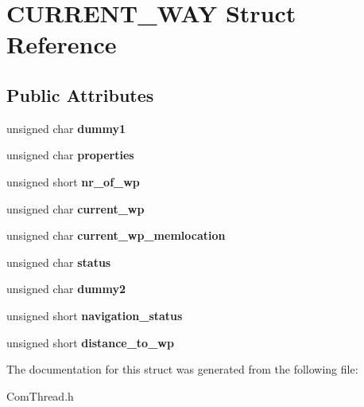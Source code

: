 \hypertarget{struct_c_u_r_r_e_n_t___w_a_y}{\section{C\-U\-R\-R\-E\-N\-T\-\_\-\-W\-A\-Y Struct Reference}
\label{struct_c_u_r_r_e_n_t___w_a_y}
}
\subsection*{Public Attributes}
\begin{DoxyCompactItemize}
\item 
\hypertarget{struct_c_u_r_r_e_n_t___w_a_y_a158c8c76ed7c0959203cd28bbc611d38}{unsigned char {\bfseries dummy1}}\label{struct_c_u_r_r_e_n_t___w_a_y_a158c8c76ed7c0959203cd28bbc611d38}

\item 
\hypertarget{struct_c_u_r_r_e_n_t___w_a_y_ab7a3409fea0fc60045f32abe8ddc23ff}{unsigned char {\bfseries properties}}\label{struct_c_u_r_r_e_n_t___w_a_y_ab7a3409fea0fc60045f32abe8ddc23ff}

\item 
\hypertarget{struct_c_u_r_r_e_n_t___w_a_y_a6d753b61f05b8285ab17ecb0079ba463}{unsigned short {\bfseries nr\-\_\-of\-\_\-wp}}\label{struct_c_u_r_r_e_n_t___w_a_y_a6d753b61f05b8285ab17ecb0079ba463}

\item 
\hypertarget{struct_c_u_r_r_e_n_t___w_a_y_a13a4422918001d68ee7341931baf1b92}{unsigned char {\bfseries current\-\_\-wp}}\label{struct_c_u_r_r_e_n_t___w_a_y_a13a4422918001d68ee7341931baf1b92}

\item 
\hypertarget{struct_c_u_r_r_e_n_t___w_a_y_a9d16911a964d60de75c8a142812cef72}{unsigned char {\bfseries current\-\_\-wp\-\_\-memlocation}}\label{struct_c_u_r_r_e_n_t___w_a_y_a9d16911a964d60de75c8a142812cef72}

\item 
\hypertarget{struct_c_u_r_r_e_n_t___w_a_y_a4202e4864ec51cda7aaef5737cac2f6a}{unsigned char {\bfseries status}}\label{struct_c_u_r_r_e_n_t___w_a_y_a4202e4864ec51cda7aaef5737cac2f6a}

\item 
\hypertarget{struct_c_u_r_r_e_n_t___w_a_y_ab8feb140fa4d9138fa239b34af3d7221}{unsigned char {\bfseries dummy2}}\label{struct_c_u_r_r_e_n_t___w_a_y_ab8feb140fa4d9138fa239b34af3d7221}

\item 
\hypertarget{struct_c_u_r_r_e_n_t___w_a_y_a2a7718fdf244ca209f3f3d35259baf4f}{unsigned short {\bfseries navigation\-\_\-status}}\label{struct_c_u_r_r_e_n_t___w_a_y_a2a7718fdf244ca209f3f3d35259baf4f}

\item 
\hypertarget{struct_c_u_r_r_e_n_t___w_a_y_a44b5f9e8b684e94bdd15e1ef0170ef73}{unsigned short {\bfseries distance\-\_\-to\-\_\-wp}}\label{struct_c_u_r_r_e_n_t___w_a_y_a44b5f9e8b684e94bdd15e1ef0170ef73}

\end{DoxyCompactItemize}


The documentation for this struct was generated from the following file\-:\begin{DoxyCompactItemize}
\item 
Com\-Thread.\-h\end{DoxyCompactItemize}
